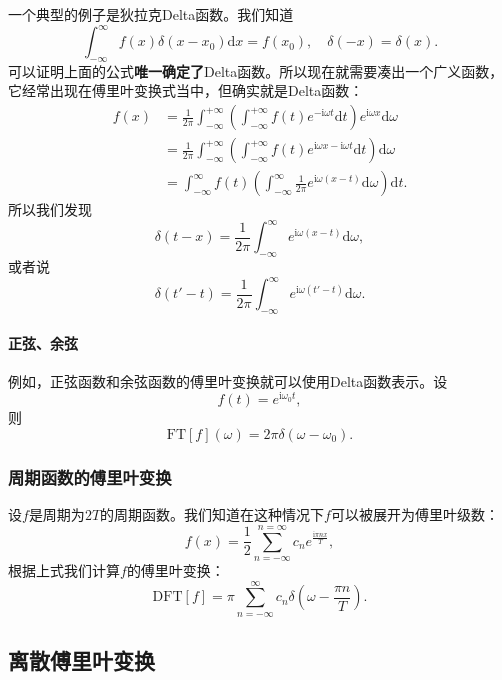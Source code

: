 一个典型的例子是狄拉克Delta函数。我们知道
\[
\int_{-\infty}^\infty f(x) \delta(x-x_0) \mathrm{d}x = f(x_0), \quad \delta(-x) = \delta(x).
\]
可以证明上面的公式\textbf{唯一确定了}Delta函数。所以现在就需要凑出一个广义函数，它经常出现在傅里叶变换式当中，但确实就是Delta函数：
\[
\begin{aligned}
    f(x) &= \frac{1}{2\pi} \int_{-\infty}^{+\infty} \left(\int_{-\infty}^{+\infty} f(t) e^{-\mathrm{i} \omega t} \mathrm{d}t \right) e^{\mathrm{i} \omega x} \mathrm{d} \omega \\
    &= \frac{1}{2\pi} \int_{-\infty}^{+\infty} \left(\int_{-\infty}^{+\infty} f(t) e^{\mathrm{i} \omega x -\mathrm{i} \omega t} \mathrm{d}t \right) \mathrm{d} \omega \\
    &= \int_{-\infty}^\infty f(t) \left( \int_{-\infty}^\infty \frac{1}{2\pi} e^{\mathrm{i} \omega (x-t)} \mathrm{d}\omega \right) \mathrm{d}t.
\end{aligned}
\]
所以我们发现
\[
\delta(t-x) = \frac{1}{2\pi} \int_{-\infty}^\infty e^{\mathrm{i} \omega (x-t)} \mathrm{d}\omega, 
\]
或者说
\[
\delta(t'-t) = \frac{1}{2\pi} \int_{-\infty}^\infty e^{\mathrm{i} \omega (t'-t)} \mathrm{d}\omega.
\]

\hypertarget{ux6b63ux5f26ux4f59ux5f26}{%
\paragraph{正弦、余弦}\label{ux6b63ux5f26ux4f59ux5f26}}

例如，正弦函数和余弦函数的傅里叶变换就可以使用Delta函数表示。设
\[
f(t) = e^{\mathrm{i}\omega_0t},
\]
则
\[
\mathrm{FT}[f](\omega) = 2\pi \delta(\omega - \omega_0).
\]

\hypertarget{ux5468ux671fux51fdux6570ux7684ux5085ux91ccux53f6ux53d8ux6362}{%
\subsubsection{周期函数的傅里叶变换}\label{ux5468ux671fux51fdux6570ux7684ux5085ux91ccux53f6ux53d8ux6362}}

设$f$是周期为$2T$的周期函数。我们知道在这种情况下$f$可以被展开为傅里叶级数：
\[
f(x) = \frac{1}{2} \sum_{n = -\infty}^{n = \infty} c_n e^{\frac{\mathrm{i}\pi n x}{T}}, 
\]
根据上式我们计算$f$的傅里叶变换：
\[
\mathrm{DFT}[f] = \pi \sum_{n=-\infty}^\infty c_n \delta(\omega - \frac{\pi n}{T}).
\]

\hypertarget{ux79bbux6563ux5085ux91ccux53f6ux53d8ux6362}{%
\subsection{离散傅里叶变换}\label{ux79bbux6563ux5085ux91ccux53f6ux53d8ux6362}}

